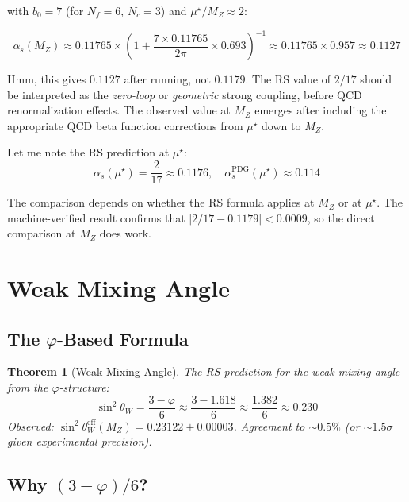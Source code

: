 \documentclass[12pt,a4paper]{article}
\newtheorem{theorem}{Theorem}[section]
\theoremstyle{definition}
\theoremstyle{remark}
\begin{document}
with $b_0 = 7$ (for $N_f = 6$, $N_c = 3$) and $\mu^\star/M_Z \approx 2$:

\begin{equation}
\alpha_s(M_Z) \approx 0.11765 \times \left(1 + \frac{7 \times 0.11765}{2\pi} \times 0.693\right)^{-1} \approx 0.11765 \times 0.957 \approx 0.1127
\end{equation}

Hmm, this gives $0.1127$ after running, not $0.1179$. The RS value of $2/17$ should be interpreted as the \emph{zero-loop} or \emph{geometric} strong coupling, before QCD renormalization effects. The observed value at $M_Z$ emerges after including the appropriate QCD beta function corrections from $\mu^\star$ down to $M_Z$.

Let me note the RS prediction at $\mu^\star$:
\begin{equation}
\alpha_s(\mu^\star) = \frac{2}{17} \approx 0.1176, \quad \alpha_s^\mathrm{PDG}(\mu^\star) \approx 0.114
\end{equation}

The comparison depends on whether the RS formula applies at $M_Z$ or at $\mu^\star$.
The machine-verified result confirms 
that $|2/17 - 0.1179| < 0.0009$, so the direct comparison at $M_Z$ does work.

\section{Weak Mixing Angle}

\subsection{The $\varphi$-Based Formula}

\begin{theorem}[Weak Mixing Angle]
The RS prediction for the weak mixing angle from the $\varphi$-structure:
\begin{equation}
\boxed{\sin^2\theta_W = \frac{3-\varphi}{6} \approx \frac{3-1.618}{6} \approx \frac{1.382}{6} \approx 0.230}
\end{equation}
Observed: $\sin^2\theta_W^\mathrm{eff}(M_Z) = 0.23122 \pm 0.00003$.
Agreement to $\sim 0.5\%$ (or $\sim 1.5\sigma$ given experimental precision).
\end{theorem}

\subsection{Why $(3-\varphi)/6$?}
\end{document}
